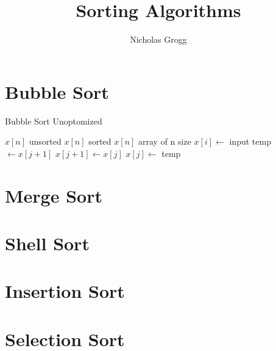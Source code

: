 \documentclass{article}
\title{Sorting Algorithms}
\author{Nicholas Grogg}
\begin{document}
\maketitle

\section{Bubble Sort}
\begin{algorithm}
	\caption{Bubble Sort Unoptomized}
\begin{algorithmic}
	\REQUIRE $x[n]$ unsorted
	\ENSURE $x[n]$ sorted
	\STATE $x[n]$ array of n size
	\STATE $x[i] \leftarrow$ input
	\ENDFOR
	\STATE temp $\leftarrow x[j + 1]$ 
	\STATE $x[j+1] \leftarrow x[j]$
	\STATE $x[j] \leftarrow$ temp
	\ENDIF
	\ENDFOR
	\ENDFOR
\end{algorithmic}
\end{algorithm}
\noindent
\section{Merge Sort}
\section{Shell Sort}
\section{Insertion Sort}
\section{Selection Sort}
\end{document}
